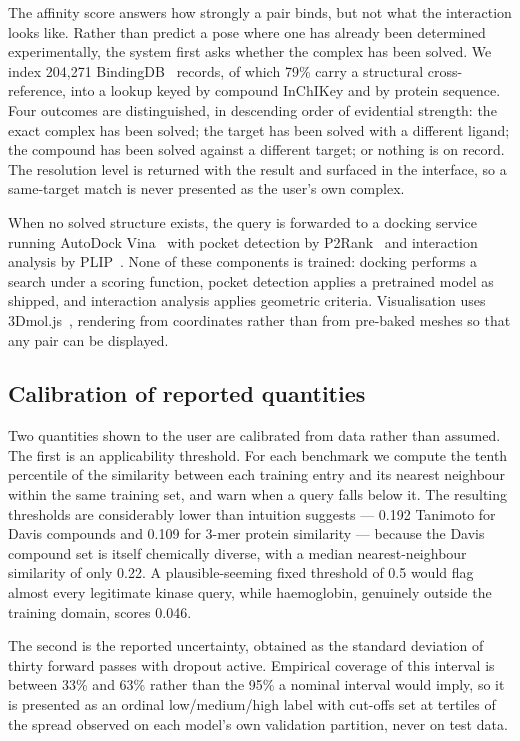 \documentclass[conference]{IEEEtran}
\begin{document}
The affinity score answers how strongly a pair binds, but not what the interaction looks like.
Rather than predict a pose where one has already been determined experimentally, the system first
asks whether the complex has been solved. We index 204{,}271 BindingDB~\cite{gilson2016} records,
of which 79\% carry a structural cross-reference, into a lookup keyed by compound InChIKey and by
protein sequence. Four outcomes are distinguished, in descending order of evidential strength:
the exact complex has been solved; the target has been solved with a different ligand; the compound
has been solved against a different target; or nothing is on record. The resolution level is
returned with the result and surfaced in the interface, so a same-target match is never presented
as the user's own complex.

When no solved structure exists, the query is forwarded to a docking service running AutoDock
Vina~\cite{trott2010} with pocket detection by P2Rank~\cite{krivak2018} and interaction analysis by
PLIP~\cite{adasme2021}. None of these components is trained: docking performs a search under a
scoring function, pocket detection applies a pretrained model as shipped, and interaction analysis
applies geometric criteria. Visualisation uses 3Dmol.js~\cite{rego2015}, rendering from coordinates
rather than from pre-baked meshes so that any pair can be displayed.

\subsection{Calibration of reported quantities}

Two quantities shown to the user are calibrated from data rather than assumed. The first is an
applicability threshold. For each benchmark we compute the tenth percentile of the similarity
between each training entry and its nearest neighbour within the same training set, and warn when a
query falls below it. The resulting thresholds are considerably lower than intuition suggests ---
0.192 Tanimoto for Davis compounds and 0.109 for 3-mer protein similarity --- because the Davis
compound set is itself chemically diverse, with a median nearest-neighbour similarity of only 0.22.
A plausible-seeming fixed threshold of 0.5 would flag almost every legitimate kinase query, while
haemoglobin, genuinely outside the training domain, scores 0.046.

The second is the reported uncertainty, obtained as the standard deviation of thirty forward passes
with dropout active. Empirical coverage of this interval is between 33\% and 63\% rather than the
95\% a nominal interval would imply, so it is presented as an ordinal low/medium/high label with
cut-offs set at tertiles of the spread observed on each model's own validation partition, never on
test data.
\end{document}
